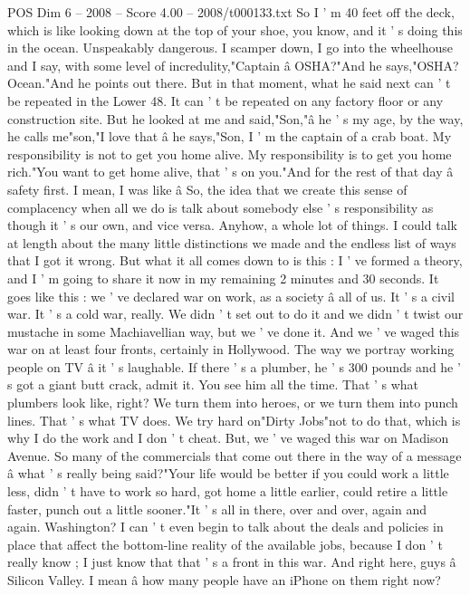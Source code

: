 \begin{textsample}{POS Dim 6 – 2008 – Score 4.00 – 2008/t000133.txt}
So I ' m 40 feet off the deck, which is like looking down at the top of your shoe, you know, and it ' s doing this in the ocean.
Unspeakably dangerous.
I scamper down, I go into the wheelhouse and I say, with some level of incredulity,"Captain â OSHA?"And he says,"OSHA?
Ocean."And he points out there.
But in that moment, what he said next can ' t be repeated in the Lower 48.
It can ' t be repeated on any factory floor or any construction site.
But he looked at me and said,"Son,"â he ' s my age, by the way, he calls me"son,"I love that â he says,"Son, I ' m the captain of a crab boat.
My responsibility is not to get you home alive.
My responsibility is to get you home rich."You want to get home alive, that ' s on you."And for the rest of that day â safety first.
I mean, I was like â So, the idea that we create this sense of complacency when all we do is talk about somebody else ' s responsibility as though it ' s our own, and vice versa.
Anyhow, a whole lot of things.
I could talk at length about the many little distinctions we made and the endless list of ways that I got it wrong.
But what it all comes down to is this : I ' ve formed a theory, and I ' m going to share it now in my remaining 2 minutes and 30 seconds.
It goes like this : we ' ve declared war on work, as a society â all of us.
It ' s a civil war.
It ' s a cold war, really.
We didn ' t set out to do it and we didn ' t twist our mustache in some Machiavellian way, but we ' ve done it.
And we ' ve waged this war on at least four fronts, certainly in Hollywood.
The way we portray working people on TV â it ' s laughable.
If there ' s a plumber, he ' s 300 pounds and he ' s got a giant butt crack, admit it.
You see him all the time.
That ' s what plumbers look like, right?
We turn them into heroes, or we turn them into punch lines.
That ' s what TV does.
We try hard on"Dirty Jobs"not to do that, which is why I do the work and I don ' t cheat.
But, we ' ve waged this war on Madison Avenue.
So many of the commercials that come out there in the way of a message â what ' s really being said?"Your life would be better if you could work a little less, didn ' t have to work so hard, got home a little earlier, could retire a little faster, punch out a little sooner."It ' s all in there, over and over, again and again.
Washington?
I can ' t even begin to talk about the deals and policies in place that affect the bottom-line reality of the available jobs, because I don ' t really know ; I just know that that ' s a front in this war.
And right here, guys â Silicon Valley.
I mean â how many people have an iPhone on them right now?

\end{textsample}
